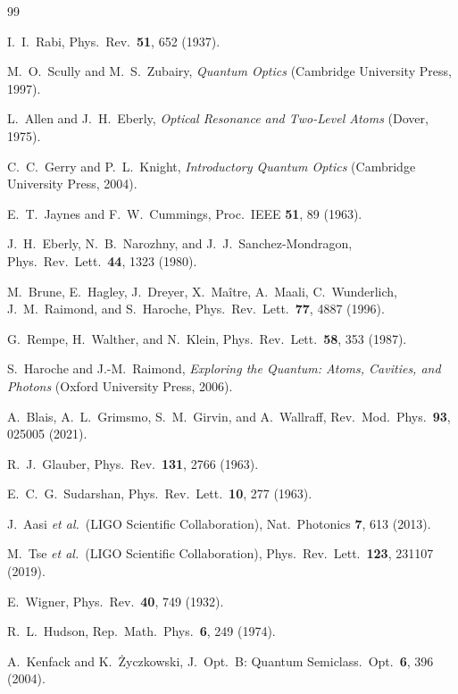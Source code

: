 \documentclass[%
 reprint,
 amsmath,amssymb,
 aps,
]{revtex4-2}
\begin{document}
\begin{thebibliography}{99}

I.~I.~Rabi, Phys.\ Rev.\ \textbf{51}, 652 (1937).

M.~O.~Scully and M.~S.~Zubairy, \textit{Quantum Optics} (Cambridge University Press, 1997).

L.~Allen and J.~H.~Eberly, \textit{Optical Resonance and Two-Level Atoms} (Dover, 1975).

C.~C.~Gerry and P.~L.~Knight, \textit{Introductory Quantum Optics} (Cambridge University Press, 2004).

E.~T.~Jaynes and F.~W.~Cummings, Proc.\ IEEE \textbf{51}, 89 (1963).

J.~H.~Eberly, N.~B.~Narozhny, and J.~J.~Sanchez-Mondragon, Phys.\ Rev.\ Lett.\ \textbf{44}, 1323 (1980).

M.~Brune, E.~Hagley, J.~Dreyer, X.~Ma\^{i}tre, A.~Maali, C.~Wunderlich, J.~M.~Raimond, and S.~Haroche, Phys.\ Rev.\ Lett.\ \textbf{77}, 4887 (1996).

G.~Rempe, H.~Walther, and N.~Klein, Phys.\ Rev.\ Lett.\ \textbf{58}, 353 (1987).

S.~Haroche and J.-M.~Raimond, \textit{Exploring the Quantum: Atoms, Cavities, and Photons} (Oxford University Press, 2006).

A.~Blais, A.~L.~Grimsmo, S.~M.~Girvin, and A.~Wallraff, Rev.\ Mod.\ Phys.\ \textbf{93}, 025005 (2021).

R.~J.~Glauber, Phys.\ Rev.\ \textbf{131}, 2766 (1963).

E.~C.~G.~Sudarshan, Phys.\ Rev.\ Lett.\ \textbf{10}, 277 (1963).

J.~Aasi \textit{et al.}\ (LIGO Scientific Collaboration), Nat.\ Photonics \textbf{7}, 613 (2013).

M.~Tse \textit{et al.}\ (LIGO Scientific Collaboration), Phys.\ Rev.\ Lett.\ \textbf{123}, 231107 (2019).

E.~Wigner, Phys.\ Rev.\ \textbf{40}, 749 (1932).

R.~L.~Hudson, Rep.\ Math.\ Phys.\ \textbf{6}, 249 (1974).

A.~Kenfack and K.~\.{Z}yczkowski, J.~Opt.~B: Quantum Semiclass.\ Opt.\ \textbf{6}, 396 (2004).


\end{thebibliography}
\end{document}
